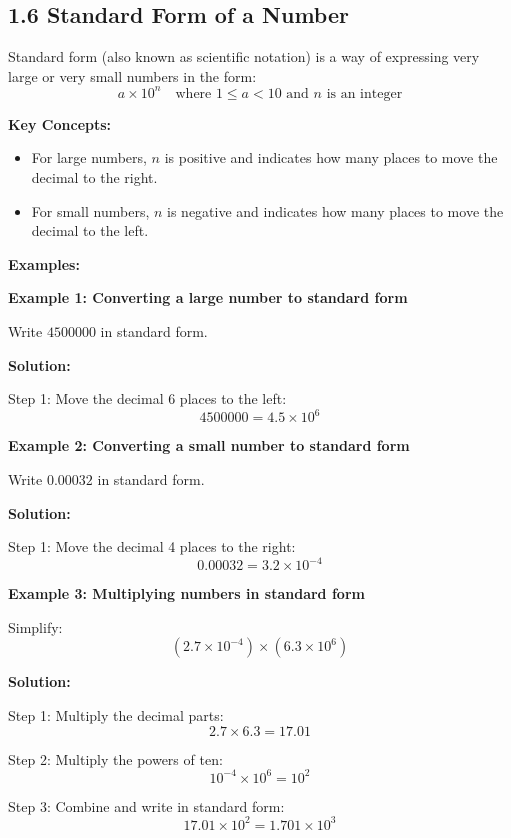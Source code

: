 
\subsection*{1.6 Standard Form of a Number}

Standard form (also known as scientific notation) is a way of expressing very large or very small numbers in the form:
\[
a \times 10^n \quad \text{where } 1 \leq a < 10 \text{ and } n \text{ is an integer}
\]

\textbf{Key Concepts:}
\begin{itemize}
    \item For large numbers, \(n\) is positive and indicates how many places to move the decimal to the right.
    \item For small numbers, \(n\) is negative and indicates how many places to move the decimal to the left.
\end{itemize}

\textbf{Examples:}

\begin{flushleft}
\textbf{Example 1: Converting a large number to standard form}

Write \( 4500000 \) in standard form.

\textbf{Solution:} \vspace{0.2cm}

Step 1: Move the decimal 6 places to the left:  
\[
4500000 = 4.5 \times 10^6
\]
\end{flushleft}

\begin{flushleft}
\textbf{Example 2: Converting a small number to standard form}

Write \( 0.00032 \) in standard form.

\textbf{Solution:} \vspace{0.2cm}

Step 1: Move the decimal 4 places to the right:  
\[
0.00032 = 3.2 \times 10^{-4}
\]
\end{flushleft}

\begin{flushleft}
\textbf{Example 3: Multiplying numbers in standard form}

Simplify:  
\[
(2.7 \times 10^{-4}) \times (6.3 \times 10^6)
\]

\textbf{Solution:} \vspace{0.2cm}

Step 1: Multiply the decimal parts:  
\[
2.7 \times 6.3 = 17.01
\]

Step 2: Multiply the powers of ten:  
\[
10^{-4} \times 10^6 = 10^2
\]

Step 3: Combine and write in standard form:  
\[
17.01 \times 10^2 = 1.701 \times 10^3
\]
\end{flushleft}


